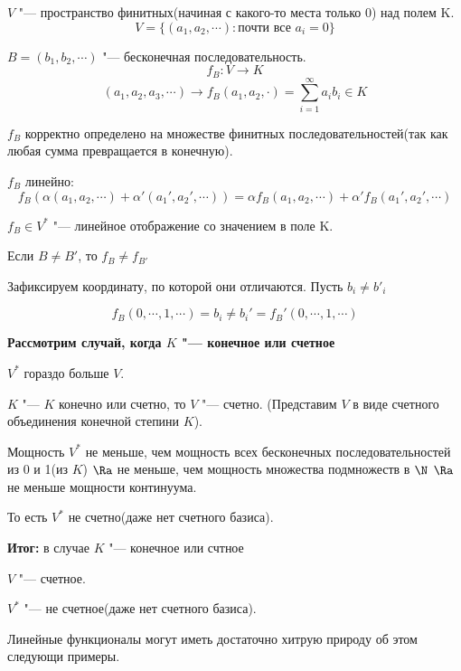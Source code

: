 \begin{exmp}
$V$ "--- пространство финитных(начиная с какого-то места только 0) над
полем K.
$$V = \{(a_1, a_2, \cdots) \colon \text{почти все } a_i = 0\}$$

$B = (b_1, b_2, \cdots)$ "--- бесконечная последовательность.
$$f_B\colon V \to K$$
$$(a_1, a_2, a_3, \cdots) \to f_B(a_1, a_2, \cdot) = \sum_{i = 1}^{\infty}a_ib_i \in K$$

$f_B$ корректно определено на множестве финитных последовательностей(так как любая сумма превращается
в конечную).

$f_B$ линейно:
$$f_B(\alpha(a_1, a_2, \cdots) + \alpha'(a_1', a_2', \cdots)) = 
\alpha f_{B}(a_1, a_2, \cdots) + \alpha' f_B(a_1', a_2', \cdots)$$

$f_B \in V^{*}$ "--- линейное отображение со значением в поле K.

Если $B \ne B'$, то $f_B \ne f_{B'}$

Зафиксируем координату, по которой они отличаются. Пусть $b_i \ne b'_i$

$$f_B(0, \cdots, 1, \cdots) = b_i \ne b_i' = f_B'(0, \cdots, 1, \cdots)$$
\end{exmp}

\textbf{Рассмотрим случай, когда $K$ "--- конечное или счетное}

$V^*$ гораздо больше $V$.

$K$ "--- $K$ конечно или счетно, то $V$ "--- счетно.  (Представим
$V$ в виде счетного объединения конечной степини $K$).

Мощность $V^{*}$ не меньше, чем мощность всех
бесконечных последовательностей из 0 и 1(из $K$)
$\Ra$ не меньше, чем мощность множества подмножеств в $\N$ 
$\Ra$ не меньше мощности континуума.

То есть $V^*$ не счетно(даже нет счетного базиса).

\textbf{Итог:} в случае $K$ "--- конечное или счтное

$V$ "--- счетное.

$V^*$ "--- не счетное(даже нет счетного базиса).


Линейные функционалы могут иметь достаточно хитрую природу
об этом следующи примеры.


